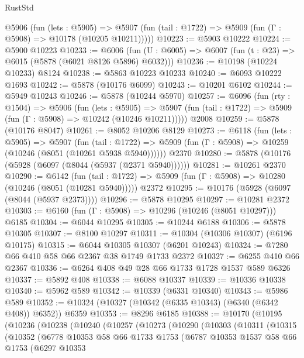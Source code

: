 \begin{lexlean}{RustStd}
\begin{coremodule}
    @5906
      (fun (lets : @5905) =>
      @5907 (fun (tail : @1722) => @5909 (fun (Γ : @5908) => @10178 (@10205 @10211)))))
@10223 := @5903 @10222
@10224 := @5900 @10223
@10233 := @6006
    (fun (U : @6005) => @6007 (fun (t : @23) => @6015 (@5878 (@6021 @8126 @5896) @6032)))
@10236 := @10198 (@10224 @10233) @8124
@10238 := @5863 @10223 @10233
@10240 := @6093 @10222 @1693
@10242 := @5878 (@10176 @6099)
@10243 := @10201 @6102
@10244 := @5949 @10243
@10246 := @5878 (@10244 @5970)
@10257 := @6096
    (fun (rty : @1504) =>
    @5906
      (fun (lets : @5905) =>
      @5907 (fun (tail : @1722) => @5909 (fun (Γ : @5908) => @10242 (@10246 @10211)))))
    @2008
@10259 := @5878 (@10176 @8047)
@10261 := @8052 @10206 @8129
@10273 := @6118
    (fun (lets : @5905) =>
    @5907
      (fun (tail : @1722) =>
      @5909 (fun (Γ : @5908) => @10259 (@10246 (@8051 (@10261 @5938 @5940))))))
    @2370
@10280 := @5878 (@10176 (@5928 (@6097 (@8044 (@5937 (@2371 @5940))))))
@10281 := @10261 @2370
@10290 := @6142
    (fun (tail : @1722) => @5909 (fun (Γ : @5908) => @10280 (@10246 (@8051 (@10281 @5940)))))
    @2372
@10295 := @10176 (@5928 (@6097 (@8044 (@5937 @2373))))
@10296 := @5878 @10295
@10297 := @10281 @2372
@10303 := @6160 (fun (Γ : @5908) => @10296 (@10246 (@8051 @10297))) @6185
@10304 := @6044 @10295
@10305 := @10244 @6188
@10306 := @5878 @10305
@10307 := @8100 @10297
@10311 := @10304 (@10306 @10307) (@6196 @10175)
@10315 := @6044 @10305 @10307 (@6201 @10243)
@10324 := @7280 @66 @410 @58 @66 @2367 @38 @1749 @1733 @2372
@10327 := @6255 @410 @66 @2367
@10336 := @6264 @408 @49 @28 @66 @1733 @1728 @1537 @589 @6326
@10337 := @5892 @408
@10338 := @6088 @10337
@10339 := @10336 @10338
@10340 := @5962 @589
@10342 := @10339 (@6331 @10340)
@10343 := @5986 @589
@10352 := @10324 (@10327 (@10342 (@6335 @10343) (@6340 (@6342 @408)) @6352)) @6359
@10353 := @8296 @6185
@10388 := @10170
    (@10195
      (@10236
        (@10238
          (@10240
            (@10257
              (@10273
                (@10290
                  (@10303
                    (@10311
                      (@10315
                        (@10352
                          (@6778
                            @10353
                            @58
                            @66
                            @1733
                            @1753
                            (@6787
                              @10353
                              @1537
                              @58
                              @66
                              @1753
                              (@6297
                                @10353

\end{coremodule}
\end{lexlean}
